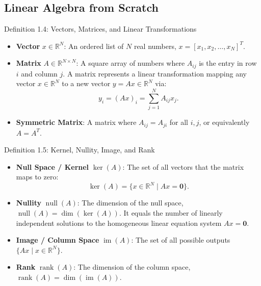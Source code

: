\documentclass[11pt]{article}
\begin{document}
\subsection{Linear Algebra from Scratch}

\begin{defbox}{Definition 1.4: Vectors, Matrices, and Linear Transformations}
\begin{itemize}[leftmargin=*,nosep]
  \item \textbf{Vector} $x \in \mathbb{R}^N$: An ordered list of $N$ real numbers, $x = [x_1, x_2, \dots, x_N]^T$.
  \item \textbf{Matrix} $A \in \mathbb{R}^{N \times N}$: A square array of numbers where $A_{ij}$ is the entry in row $i$ and column $j$. A matrix represents a linear transformation mapping any vector $x \in \mathbb{R}^N$ to a new vector $y = Ax \in \mathbb{R}^N$ via:
  \begin{equation}
    y_i = (Ax)_i = \sum_{j=1}^N A_{ij} x_j.
  \end{equation}
  \item \textbf{Symmetric Matrix}: A matrix where $A_{ij} = A_{ji}$ for all $i, j$, or equivalently $A = A^T$.
\end{itemize}
\end{defbox}

\begin{defbox}{Definition 1.5: Kernel, Nullity, Image, and Rank}
\begin{itemize}[leftmargin=*,nosep]
  \item \textbf{Null Space / Kernel} $\ker(A)$: The set of all vectors that the matrix maps to zero:
  \begin{equation}
    \ker(A) = \{x \in \mathbb{R}^N \mid Ax = \mathbf{0}\}.
  \end{equation}
  \item \textbf{Nullity} $\operatorname{null}(A)$: The dimension of the null space, $\operatorname{null}(A) = \dim(\ker(A))$. It equals the number of linearly independent solutions to the homogeneous linear equation system $Ax = \mathbf{0}$.
  \item \textbf{Image / Column Space} $\operatorname{im}(A)$: The set of all possible outputs $\{Ax \mid x \in \mathbb{R}^N\}$.
  \item \textbf{Rank} $\operatorname{rank}(A)$: The dimension of the column space, $\operatorname{rank}(A) = \dim(\operatorname{im}(A))$.
\end{itemize}
\end{defbox}
\end{document}
